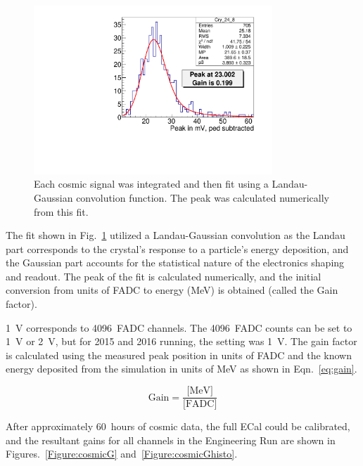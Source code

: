 \begin{figure}[htb]
  \centering
      \includegraphics[width=0.8\textwidth]{pics/performance/cosmicFitExample2015.pdf}
  \caption[Integrated cosmic signal in ECal fitted for calibration]{Each cosmic signal was integrated and then fit using a Landau-Gaussian convolution function. The peak was calculated numerically from this fit.}
  \label{Figure:cosmicFit}
\end{figure}

The fit shown in Fig.~\ref{Figure:cosmicFit} utilized a Landau-Gaussian convolution as the Landau part corresponds to the crystal's response to a particle's energy deposition, and the Gaussian part accounts for the statistical nature of the electronics shaping and readout. The peak of the fit is calculated numerically, and the initial conversion from units of FADC to energy (MeV) is obtained (called the Gain factor). 

1~V corresponds to 4096~FADC channels. The 4096~FADC counts can be set to 1~V or 2~V, but for 2015 and 2016 running, the setting was 1~V. The gain factor is calculated using the measured peak position in units of FADC and the known energy deposited from the simulation in units of MeV as shown in Eqn.~\eqref{eq:gain}.

\begin{equation}
	\label{eq:gain}
	\textrm{Gain} = \dfrac{\textrm{[MeV]}}{\textrm{[FADC]}} 
\end{equation}

After approximately 60~hours of cosmic data, the full ECal could be calibrated, and the resultant gains for all channels in the Engineering Run are shown in Figures.~\ref{Figure:cosmicG} and~\ref{Figure:cosmicGhisto}.

